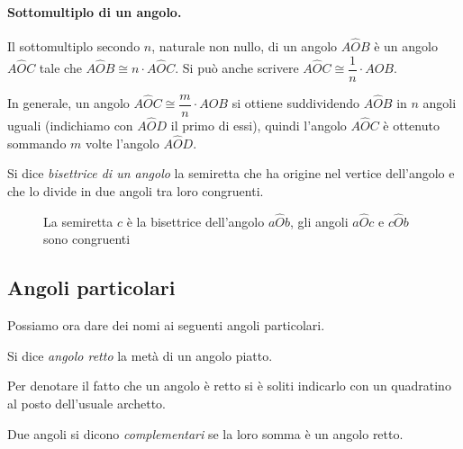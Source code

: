 \paragraph{Sottomultiplo di un angolo.} Il sottomultiplo secondo $n$, naturale non nullo, di un angolo $A\widehat{O}B$ è un angolo $A\widehat{O}C$ tale che $A\widehat{O}B \cong n\cdot A\widehat{O}C$. Si può anche scrivere $A\widehat{O}C\cong \dfrac{1}{n}\cdot A\widehat{O}B$.

In generale, un angolo $A\widehat{O}C\cong\dfrac{m}{n}\cdot A\widehat{O}B$ si ottiene suddividendo $A\widehat{O}B$ in $n$ angoli uguali (indichiamo con $A\widehat{O}D$ il primo di essi), quindi l'angolo $A\widehat{O}C$ è ottenuto sommando $m$ volte l'angolo $A\widehat{O}D$.

\begin{definizione}
Si dice \emph{bisettrice di un angolo} la semiretta che ha origine nel vertice dell'angolo e che lo divide in due angoli tra loro congruenti.
\end{definizione}

\begin{figure}[htb]
\centering
\caption{La semiretta $c$ è la bisettrice dell'angolo $a\widehat{O}b$, gli angoli $a\widehat{O}c$ e $c\widehat{O}b$ sono congruenti}
\end{figure}

\subsection{Angoli particolari}

Possiamo ora dare dei nomi ai seguenti angoli particolari.

\begin{definizione}
Si dice \emph{angolo retto} la metà di un angolo piatto.
\end{definizione}

Per denotare il fatto che un angolo è retto si è soliti indicarlo con un quadratino al posto dell'usuale archetto.

\begin{figure}[htb]
\centering
\end{figure}

\begin{definizione}
Due angoli si dicono \emph{complementari} se la loro somma è un angolo retto.
\end{definizione}

\begin{figure}[htb]
\centering
\end{figure}

